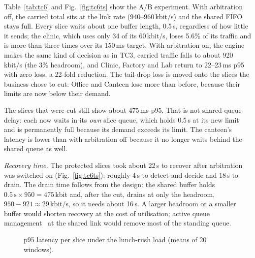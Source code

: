 \documentclass[conference]{IEEEtran}
\newcommand{\kbps}{\,kbit/s}
\begin{document}
Table~\ref{tab:tc6} and Fig.~\ref{fig:tc6ts} show the A/B experiment. With arbitration off, the carried total sits at the link rate (940--960\kbps{}) and the shared FIFO stays full. Every slice waits about one buffer length, 0.5\,s, regardless of how little it sends; the clinic, which uses only 34 of its 60\kbps{}, loses 5.6\% of its traffic and is more than three times over its 150\,ms target. With arbitration on, the engine makes the same kind of decision as in TC3, carried traffic falls to about 920\kbps{} (the 3\% headroom), and Clinic, Factory and Lab return to 22--23\,ms p95 with zero loss, a 22-fold reduction. The tail-drop loss is moved onto the slices the business chose to cut: Office and Canteen lose more than before, because their limits are now below their demand.

The slices that were cut still show about 475\,ms p95. That is not shared-queue delay: each now waits in its \emph{own} slice queue, which holds 0.5\,s at its new limit and is permanently full because its demand exceeds its limit. The canteen's latency is lower than with arbitration off because it no longer waits behind the shared queue as well.

\textit{Recovery time.} The protected slices took about 22\,s to recover after arbitration was switched on (Fig.~\ref{fig:tc6ts}): roughly 4\,s to detect and decide and 18\,s to drain. The drain time follows from the design: the shared buffer holds $0.5\,\text{s} \times 950 = 475$\,kbit and, after the cut, drains at only the headroom, $950 - 921 \approx 29$\kbps{}, so it needs about 16\,s. A larger headroom or a smaller buffer would shorten recovery at the cost of utilisation; active queue management~\cite{nichols2012} at the shared link would remove most of the standing queue.

\begin{figure}[t]
\centering
{}
\caption{p95 latency per slice under the lunch-rush load (means of 20 windows).}
\label{fig:tc6bars}
\end{figure}
\end{document}
